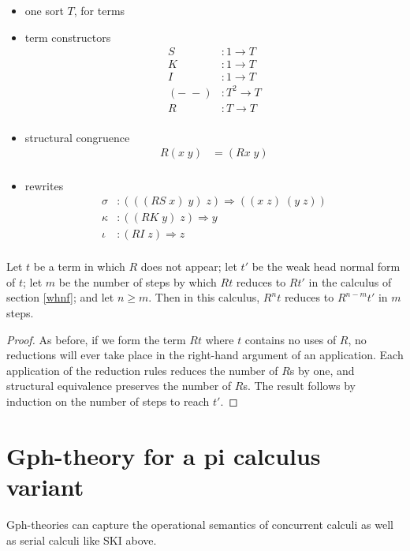 \documentclass[a4paper,UKenglish]{lipics-v2016}
\begin{document}
\begin{itemize}
  \item one sort $T$, for terms
  \item term constructors
  \[\begin{array}{rl}
    S&:1 \to T\\
    K&:1 \to T\\
    I&:1 \to T\\
    (-\; -)&: T^2 \to T\\
    R&:T \to T\\
  \end{array}\]
  \item structural congruence
  \[\begin{array}{rl}
    R(x\; y) &= (Rx\; y)\\
  \end{array}\]
  \item rewrites
  \[\begin{array}{rl}
    \sigma&:(((RS\; x)\; y)\; z) \Rightarrow ((x\; z)\; (y\; z))\\
    \kappa&:((RK\; y)\; z) \Rightarrow y\\
    \iota&:(RI\; z) \Rightarrow z\\
  \end{array}\]
\end{itemize}

\begin{theorem}
  Let $t$ be a term in which $R$ does not appear; let $t'$ be the weak head normal form of $t$; let $m$ be the number of steps by which $Rt$ reduces to $Rt'$ in the calculus of section \ref{whnf}; and let $n\ge m$.  Then in this calculus, $R^n t$ reduces to $R^{n-m}t'$ in $m$ steps.
\end{theorem}

\begin{proof}
As before, if we form the term $Rt$ where $t$ contains no uses of $R$, no reductions will ever take place in the right-hand argument of an application.  Each application of the reduction rules reduces the number of $R$s by one, and structural equivalence preserves the number of $R$s.  The result follows by induction on the number of steps to reach $t'.$
\end{proof}

\section{Gph-theory for a pi calculus variant}
\label{rhocomb}
Gph-theories can capture the operational semantics of concurrent calculi as well as serial calculi like SKI above.
\end{document}
